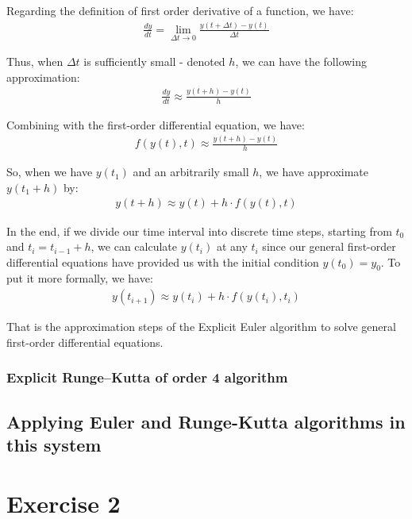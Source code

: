 \documentclass[a4paper]{article}
\begin{document}
Regarding the definition of first order derivative of a function, we have:
\begin{gather*}
  \frac{dy}{dt} = \lim_{\Delta t \rightarrow 0} \frac{y(t + \Delta t) - y(t)}{\Delta t}
\end{gather*}

Thus, when \(\Delta t\) is sufficiently small - denoted \(h\), we can have the following approximation:
\begin{gather*}
  \frac{dy}{dt} \approx \frac{y(t + h) - y(t)}{h}
\end{gather*}

Combining with the first-order differential equation, we have:
\begin{gather*}
  f(y(t),t) \approx \frac{y(t + h) - y(t)}{h}
\end{gather*}

So, when we have \(y(t_1)\) and an arbitrarily small \(h\), we have approximate \(y(t_1 + h)\) by:
\begin{gather*}
  y(t + h) \approx y(t) + h \cdot f(y(t),t)
\end{gather*}

In the end, if we divide our time interval into discrete time steps, starting from \(t_0\) and \(t_i = t_{i-1} + h\), we can calculate \(y(t_i)\) at any \(t_i\) since our general first-order differential equations have provided us with the initial condition \(y(t_0) = y_0\). To put it more formally, we have:
\begin{gather*}
  y(t_{i+1}) \approx y(t_i) + h \cdot f(y(t_i), t_i)
\end{gather*}

That is the approximation steps of the Explicit Euler algorithm to solve general first-order differential equations.

\subsubsection{Explicit Runge–Kutta of order 4 algorithm}


\subsection{Applying Euler and Runge-Kutta algorithms in this system}



\newpage
\section{Exercise 2}
\end{document}
